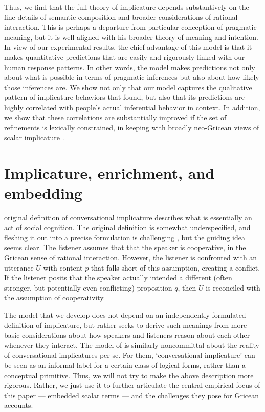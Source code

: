 \documentclass[leqno]{article}
\begin{document}

Thus, we find that the full theory of implicature depends
substantively on the fine details of semantic composition and broader
considerations of rational interaction. This is perhaps a departure
from  particular conception of pragmatic meaning,
but it is well-aligned with his broader theory of meaning and
intention.  In view of our experimental results, the chief advantage
of this model is that it makes quantitative predictions that are
easily and rigorously linked with our human response patterns. In
other words, the model makes predictions not only about what is
possible in terms of pragmatic inferences but also about how likely
those inferences are. We show not only that our model captures the
qualitative pattern of implicature behaviors that
\citeauthor{Chemla:Spector:2011} found, but also that its predictions
are highly correlated with people's actual inferential behavior in
context. In addition, we show that these correlations are
substantially improved if the set of refinements is lexically
constrained, in keeping with broadly neo-Gricean views of scalar
implicature \citep{Horn72,Gazdar79b,Gazdar79a,SchulzVanRooij06}.


\section{Implicature, enrichment, and embedding}\label{sec:implicature}

 original definition of conversational implicature
describes what is essentially an act of social cognition. The original
definition is somewhat underspecified, and fleshing it out into a
precise formulation is challenging \citep{Hirschberg85}, but the
guiding idea seems clear.  The listener assumes that that the speaker
is cooperative, in the Gricean sense of rational interaction. However,
the listener is confronted with an utterance $U$ with content $p$ that
falls short of this assumption, creating a conflict. If the listener
posits that the speaker actually intended a different (often stronger,
but potentially even conflicting) proposition $q$, then $U$ is
reconciled with the assumption of cooperativity.

The model that we develop does not depend on an independently
formulated definition of implicature, but rather seeks to derive such
meanings from more basic considerations about how speakers and
listeners reason about each other whenever they interact. The model of
\citet{ChierchiaFoxSpector08} is similarly noncommittal about the
reality of conversational implicatures per se. For them,
`conversational implicature' can be seen as an informal label for a
certain class of logical forms, rather than a conceptual
primitive. Thus, we will not try to make the above description more
rigorous. Rather, we just use it to further articulate the central
empirical focus of this paper --- embedded scalar terms --- and the
challenges they pose for Gricean accounts.
\end{document}
